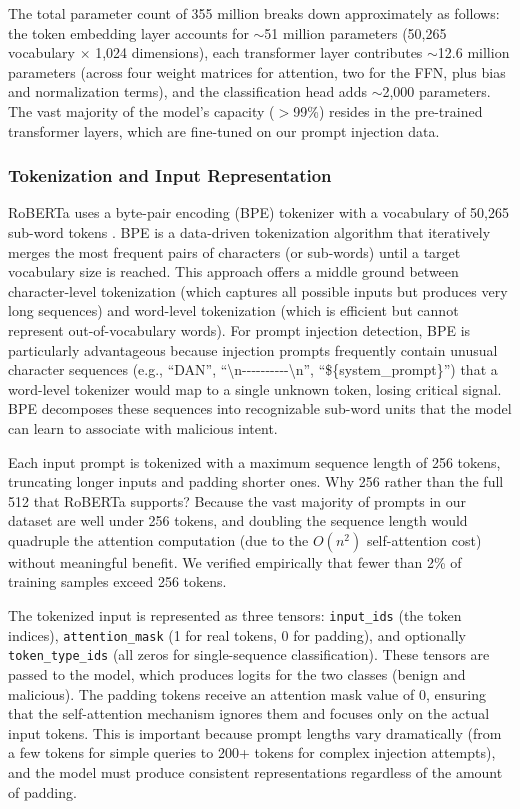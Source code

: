 \documentclass[12pt, letterpaper]{article}   %
\begin{document}
The total parameter count of 355 million breaks down approximately as follows: the token embedding layer accounts for $\sim$51 million parameters (50,265 vocabulary $\times$ 1,024 dimensions), each transformer layer contributes $\sim$12.6 million parameters (across four weight matrices for attention, two for the FFN, plus bias and normalization terms), and the classification head adds $\sim$2,000 parameters. The vast majority of the model's capacity ($>$99\%) resides in the pre-trained transformer layers, which are fine-tuned on our prompt injection data.

\subsubsection{Tokenization and Input Representation}

RoBERTa uses a byte-pair encoding (BPE) tokenizer with a vocabulary of 50,265 sub-word tokens \cite{ref37}. BPE is a data-driven tokenization algorithm that iteratively merges the most frequent pairs of characters (or sub-words) until a target vocabulary size is reached. This approach offers a middle ground between character-level tokenization (which captures all possible inputs but produces very long sequences) and word-level tokenization (which is efficient but cannot represent out-of-vocabulary words). For prompt injection detection, BPE is particularly advantageous because injection prompts frequently contain unusual character sequences (e.g., ``DAN'', ``\textbackslash n-{}-{}-{}-{}-{}-{}-{}-{}-{}-{}\textbackslash n'', ``\$\{system\_prompt\}'') that a word-level tokenizer would map to a single unknown token, losing critical signal. BPE decomposes these sequences into recognizable sub-word units that the model can learn to associate with malicious intent.

Each input prompt is tokenized with a maximum sequence length of 256 tokens, truncating longer inputs and padding shorter ones. Why 256 rather than the full 512 that RoBERTa supports? Because the vast majority of prompts in our dataset are well under 256 tokens, and doubling the sequence length would quadruple the attention computation (due to the $O(n^2)$ self-attention cost) without meaningful benefit. We verified empirically that fewer than 2\% of training samples exceed 256 tokens.

The tokenized input is represented as three tensors: \texttt{input\_ids} (the token indices), \texttt{attention\_mask} (1 for real tokens, 0 for padding), and optionally \texttt{token\_type\_ids} (all zeros for single-sequence classification). These tensors are passed to the model, which produces logits for the two classes (benign and malicious). The padding tokens receive an attention mask value of 0, ensuring that the self-attention mechanism ignores them and focuses only on the actual input tokens. This is important because prompt lengths vary dramatically (from a few tokens for simple queries to 200+ tokens for complex injection attempts), and the model must produce consistent representations regardless of the amount of padding.
\end{document}
